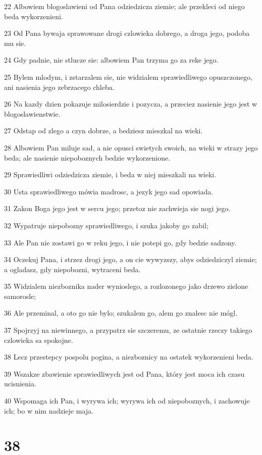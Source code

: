 \par 22 Albowiem blogoslawieni od Pana odziedzicza ziemie; ale przekleci od niego beda wykorzenieni.
\par 23 Od Pana bywaja sprawowane drogi czlowieka dobrego, a droga jego, podoba mu sie.
\par 24 Gdy padnie, nie stlucze sie: albowiem Pan trzyma go za reke jego.
\par 25 Bylem mlodym, i zstarzalem sie, nie widzialem sprawiedliwego opuszczonego, ani nasienia jego zebrzacego chleba.
\par 26 Na kazdy dzien pokazuje milosierdzie i pozycza, a przeciez nasienie jego jest w blogoslawienstwie.
\par 27 Odstap od zlego a czyn dobrze, a bedziesz mieszkal na wieki.
\par 28 Albowiem Pan miluje sad, a nie opusci swietych swoich, na wieki w strazy jego beda; ale nasienie niepoboznych bedzie wykorzenione.
\par 29 Sprawiedliwi odziedzicza ziemie, i beda w niej mieszkali na wieki.
\par 30 Usta sprawiedliwego mówia madrosc, a jezyk jego sad opowiada.
\par 31 Zakon Boga jego jest w sercu jego; przetoz nie zachwieja sie nogi jego.
\par 32 Wypatruje niepobozny sprawiedliwego, i szuka jakoby go zabil;
\par 33 Ale Pan nie zostawi go w reku jego, i nie potepi go, gdy bedzie sadzony.
\par 34 Oczekuj Pana, i strzez drogi jego, a on cie wywyzszy, abys odziedziczyl ziemie; a ogladasz, gdy niepobozni, wytraceni beda.
\par 35 Widzialem niezboznika nader wynioslego, a rozlozonego jako drzewo zielone samorosle;
\par 36 Ale przeminal, a oto go nie bylo; szukalem go, alem go znalesc nie mógl.
\par 37 Spojrzyj na niewinnego, a przypatrz sie szczeremu, ze ostatnie rzeczy takiego czlowieka sa spokojne.
\par 38 Lecz przestepcy pospolu pogina, a niezboznicy na ostatek wykorzenieni beda.
\par 39 Wszakze zbawienie sprawiedliwych jest od Pana, który jest moca ich czasu ucisnienia.
\par 40 Wspomaga ich Pan, i wyrywa ich; wyrywa ich od niepoboznych, i zachowuje ich; bo w nim nadzieje maja.

\chapter{38}

